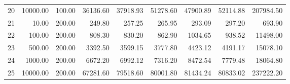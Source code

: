 \begin{table}[ht]
\begin{tabular}{rrrrrrrrr}
  20 & 10000.00 & 100.00 & 36136.60 & 37918.93 & 51278.60 & 47900.89 & 52114.88 & 207984.50 \\ 
  21 & 10.00 & 200.00 & 249.80 & 257.25 & 265.95 & 293.09 & 297.20 & 693.90 \\ 
  22 & 100.00 & 200.00 & 808.30 & 830.20 & 862.90 & 1034.65 & 938.52 & 11498.00 \\ 
  23 & 500.00 & 200.00 & 3392.50 & 3599.15 & 3777.80 & 4423.12 & 4191.17 & 15078.10 \\ 
  24 & 1000.00 & 200.00 & 6672.20 & 6992.12 & 7316.20 & 8472.54 & 7779.48 & 18064.80 \\ 
  25 & 10000.00 & 200.00 & 67281.60 & 79518.60 & 80001.80 & 81434.24 & 80833.02 & 237222.20 \\ 
   \hline
\end{tabular}
\end{table}

